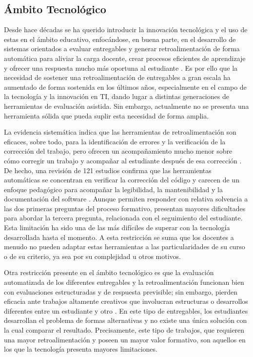 \documentclass[letterpaper, 10 pt, conference]{ieeeconf}
\begin{document}
\subsection{Ámbito Tecnológico}  

Desde hace décadas se ha querido introducir la innovación tecnológica y el uso de estas en el ámbito educativo, enfocándose, en buena parte, en el desarrollo de sistemas orientados a evaluar entregables y generar retroalimentación de forma automática para aliviar la carga docente, crear procesos eficientes de aprendizaje y ofrecer una respuesta mucho más oportuna al estudiante \cite{9}. Es por ello que la necesidad de sostener una retroalimentación de entregables a gran escala ha aumentado de forma sostenida en los últimos años, especialmente en el campo de la tecnología y la innovación en TI, dando lugar a distintas generaciones de herramientas de evaluación asistida. Sin embargo, actualmente no se presenta una herramienta sólida que pueda suplir esta necesidad de forma amplia. 

La evidencia sistemática indica que las herramientas de retroalimentación son eficaces, sobre todo, para la identificación de errores y la verificación de la corrección del trabajo, pero ofrecen un acompañamiento mucho menor sobre cómo corregir un trabajo y acompañar al estudiante después de esa corrección \cite{10}. De hecho, una revisión de 121 estudios confirma que las herramientas automáticas se concentran en verificar la corrección del código y carecen de un enfoque pedagógico para acompañar la legibilidad, la mantenibilidad y la documentación del software \cite{11}. Aunque permiten responder con relativa solvencia a las dos primeras preguntas del proceso formativo, presentan mayores dificultades para abordar la tercera pregunta, relacionada con el seguimiento del estudiante. Esta limitación ha sido una de las más difíciles de superar con la tecnología desarrollada hasta el momento. A esta restricción se suma que los docentes a menudo no pueden adaptar estas herramientas a las particularidades de su curso o de su criterio, ya sea por su complejidad u otros motivos. 

Otra restricción presente en el ámbito tecnológico es que la evaluación automatizada de los diferentes entregables y la retroalimentación funcionan bien con evaluaciones estructuradas y de respuesta previsible; sin embargo, pierden eficacia ante trabajos altamente creativos que involucran estructuras o desarrollos diferentes entre un estudiante y otro \cite{11}. En este tipo de entregables, los estudiantes desarrollan el problema de formas alternativas y no existe una única solución con la cual comparar el resultado. Precisamente, este tipo de trabajos, que requieren una mayor retroalimentación y poseen un mayor valor formativo, son aquellos en los que la tecnología presenta mayores limitaciones. 
\end{document}
